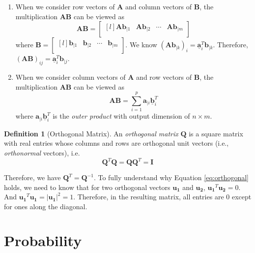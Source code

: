 \documentclass[12pt]{article}
\newcommand{\ul}[1]{\underline{#1}}
\theoremstyle{definition}
\newtheorem{definition}{Definition}[section]
\begin{document}
\begin{enumerate}[label=\theenumi)]
    \item When we consider row vectors of $\bm{A}$ and column vectors of $\bm{B}$, the multiplication $\bm{AB}$ can be viewed as
        \begin{equation}
            \bm{A}\bm{B} =  \begin{bmatrix*}[l]
            \bm{Ab}_{|1} & \bm{Ab}_{|2} & \cdots & \bm{Ab}_{|m}\\
            \end{bmatrix*}
        \end{equation}
    where $\bm{B}=\begin{bmatrix*}[l]
        \bm{b}_{|1} & \bm{b}_{|2} & \cdots & \bm{b}_{|m}\\
        \end{bmatrix*}$. We know $(\bm{Ab}_{|k})_i=\bm{\ul{a}}_i^T\bm{b}_{|k}$. Therefore, $(\bm{AB})_{ij}=\bm{\ul{a}}_i^T\bm{b}_{|j}$.
        
    \item When we consider column vectors of $\bm{A}$ and row vectors of $\bm{B}$, the multiplication $\bm{AB}$ can be viewed as 
    \begin{equation}\label{eq:mmult_2}
        \bm{AB}=\sum_{i=1}^{p}\bm{a}_{|i}\bm{\ul{b}}_i^T
    \end{equation}
    where $\bm{a}_{|i}\bm{\ul{b}}_i^T$ is the \emph{outer product} with output dimension of $n\times m$.
\end{enumerate} 

\begin{definition}[Orthogonal Matrix]
An \emph{orthogonal matrix} $\bm{Q}$ is a square matrix with real entries whose columns and rows are orthogonal unit vectors (i.e., \emph{orthonormal} vectors), i.e.
\begin{equation}\label{eq:orthogonal}
    \bm{Q}^T\bm{Q}=\bm{Q}\bm{Q}^T=\bm{I}
\end{equation}
\end{definition}
Therefore, we have $\bm{Q}^T=\bm{Q}^{-1}$. To fully understand why Equation \ref{eq:orthogonal} holds, we need to know that for two orthogonal vectors $\bm{u_1}$ and $\bm{u_2}$, $\bm{u_1}^T\bm{u_2}=0$. And $\bm{u_1}^T\bm{u_1}=|\bm{u_1}|^2=1$. Therefore, in the resulting matrix, all entries are 0 except for ones along the diagonal.

\section{Probability}
\end{document}
